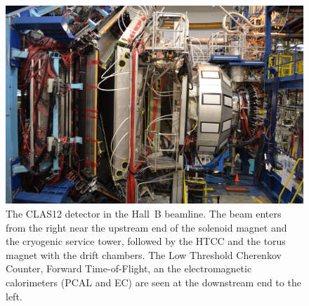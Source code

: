 \documentclass[final,3p,twocolumn]{elsarticle}
\begin{document}
\begin{figure}[bhtp!]
\centerline{\includegraphics[width=1.4\columnwidth]{CLAS12_photo-1.jpg}}
\caption{The CLAS12 detector in the Hall~B beamline. The beam enters from the right near the upstream end of
  the solenoid magnet and the cryogenic service tower, followed by the HTCC and the torus magnet with the drift
  chambers. The Low Threshold Cherenkov Counter, Forward Time-of-Flight, an the electromagnetic calorimeters
  (PCAL and EC) are seen at the downstream end to the left.}
\label{clas12-photo}
\end{figure}
\end{document}
